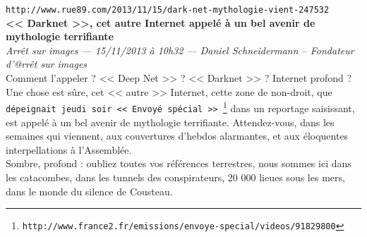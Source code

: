 \documentclass[11pt,twoside,a4paper]{article}
\begin{document}
\setlength\parindent{0pt}







\texttt{http://www.rue89.com/2013/11/15/dark-net-mythologie-vient-247532}~\\

\textbf{<< Darknet >>, cet autre Internet appel{\'e} {\`a} un bel avenir de mythologie terrifiante}~\\

\emph{\small Arr{\^e}t sur images --- 15/11/2013 {\`a} 10h32 --- Daniel Schneidermann -- Fondateur d'@rr{\^e}t sur images  }~\\

Comment l'appeler ? << Deep Net >> ? << Darknet >> ? Internet profond ? Une chose est s{\^u}re, cet << autre >> Internet, cette zone de non-droit, que \texttt{d{\'e}peignait jeudi soir << Envoy{\'e} sp{\'e}cial >>~\footnote{\texttt{http://www.france2.fr/emissions/envoye-special/videos/91829800}}} dans un reportage saisissant, est appel{\'e} {\`a} un bel avenir de mythologie terrifiante. Attendez-vous, dans les semaines qui viennent, aux couvertures d'hebdos alarmantes, et aux {\'e}loquentes interpellations {\`a} l'Assembl{\'e}e. ~\\

Sombre, profond : oubliez toutes vos r{\'e}f{\'e}rences terrestres, nous sommes ici dans les catacombes, dans les tunnels des conspirateurs, 20 000 lieues sous les mers, dans le monde du silence de Cousteau. ~\\
\end{document}
